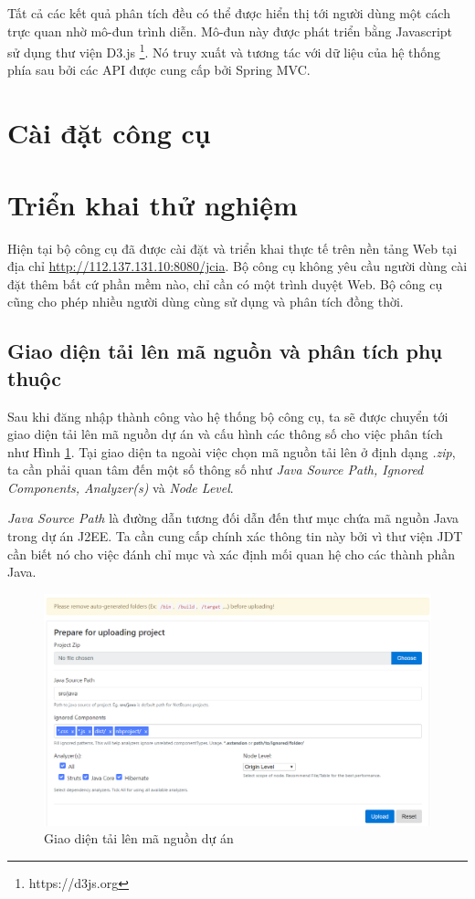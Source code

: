 \documentclass[12pt]{report}
\begin{document}
Tất cả các kết quả phân tích đều có thể được hiển thị tới người dùng một cách trực quan nhờ mô-đun trình diễn. Mô-đun này được phát triển bằng Javascript sử dụng thư viện D3.js \footnote{  https://d3js.org}. Nó truy xuất và tương tác với dữ liệu của hệ thống phía sau bởi các API được cung cấp bởi Spring MVC.

\section{Cài đặt công cụ}
\section{Triển khai thử nghiệm}

Hiện tại bộ công cụ đã được cài đặt và triển khai thực tế trên nền tảng Web tại địa chỉ \url{http://112.137.131.10:8080/jcia}. Bộ công cụ không yêu cầu người dùng cài đặt thêm bất cứ phần mềm nào, chỉ cần có một trình duyệt Web. Bộ công cụ cũng cho phép nhiều người dùng cùng sử dụng và phân tích đồng thời.

\subsection{Giao diện tải lên mã nguồn và phân tích phụ thuộc}
Sau khi đăng nhập thành công vào hệ thống bộ công cụ, ta sẽ được chuyển tới giao diện tải lên mã nguồn dự án và cấu hình các thông số cho việc phân tích như Hình \ref{fig:jcia-upload}. Tại giao diện ta ngoài việc chọn mã nguồn tải lên ở định dạng \textit{.zip}, ta cần phải quan tâm đến một số thông số như \textit{Java Source Path, Ignored Components, Analyzer(s)} và \textit{Node Level}.

\textit{Java Source Path} là đường dẫn tương đối dẫn đến thư mục chứa mã nguồn Java trong dự án J2EE. Ta cần cung cấp chính xác thông tin này bởi vì thư viện JDT cần biết nó cho việc đánh chỉ mục và xác định mối quan hệ cho các thành phần Java.

\begin{figure}[h]
	\centering
	\includegraphics[width=0.9\linewidth]{jcia-upload}
	\caption{Giao diện tải lên mã nguồn dự án}
	\label{fig:jcia-upload}
\end{figure}
\end{document}
